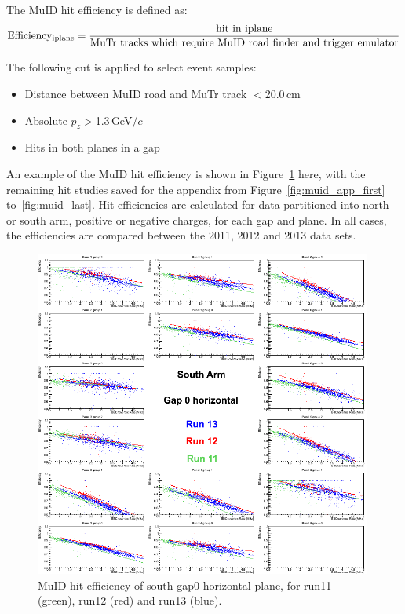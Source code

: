 {\noindent}The MuID hit efficiency is defined as:
\begin{equation}
{\rm Efficiency_{iplane}}=\frac{\rm hit~in~iplane}{\rm MuTr~tracks~which~require~MuID~road~finder~and~trigger~emulator}
\end{equation}

{\noindent}The following cut is applied to select event samples:
\begin{itemize}
  \item Distance between MuID road and MuTr track $<$20.0\,cm
  \item Absolute $p_{z}$$>$1.3\,GeV/$c$
  \item Hits in both planes in a gap
\end{itemize}

{\noindent}An example of the MuID hit efficiency is shown in
Figure~\ref{fig:muid_first} here, with the remaining hit studies saved for the
appendix from Figure~\ref{fig:muid_app_first} to~\ref{fig:muid_last}. Hit
efficiencies are calculated for data partitioned into north or south arm,
positive or negative charges, for each gap and plane.  In all cases, the
efficiencies are compared between the 2011, 2012 and 2013 data sets.

\begin{center}
  \begin{figure}[p]
    \includegraphics[width=0.99\textwidth]{./figures/efficomp_South_gap0_horizontal.png}
    \caption{\label{Fig:efficiency:MuIdEff:a0g0p0}MuID hit efficiency of south
    gap0 horizontal plane, for run11 (green), run12 (red) and run13 (blue).}
  \label{fig:muid_first}
\end{figure}
\end{center}

